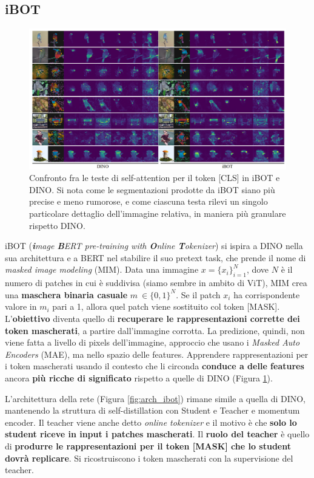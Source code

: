 \subsection{iBOT}
\begin{figure}[!t]
    \centering
    \includegraphics[width=\textwidth]{Immagini/ssl/ibot_vs_dino.png}
    \caption{Confronto fra le teste di self-attention per il token [CLS] in iBOT e DINO. Si nota come le segmentazioni prodotte da iBOT siano più precise e meno rumorose, e come ciascuna testa rilevi un singolo particolare dettaglio dell'immagine relativa, in maniera più granulare rispetto DINO.}
    \label{fig:ibotvsdino}
\end{figure}
iBOT (\textit{\textbf{i}mage \textbf{B}ERT pre-training with \textbf{O}nline \textbf{T}okenizer}) si ispira a DINO nella sua architettura e a BERT nel stabilire il suo pretext task, che prende il nome di \textit{masked image modeling} (MIM). Data una immagine \(x=\{x_i\}^N_{i=1}\), dove \(N\) è il numero di patches in cui è suddivisa (siamo sembre in ambito di ViT), MIM crea una \textbf{maschera binaria casuale} \(m \ \in \{0, 1\}^N\). Se il patch \(x_i\) ha corrispondente valore in \(m_i\) pari a 1, allora quel patch viene sostituito col token [MASK]. L'\textbf{obiettivo} diventa quello di \textbf{recuperare le rappresentazioni corrette dei token mascherati}, a partire dall'immagine corrotta. La predizione, quindi, non viene fatta a livello di pixels dell'immagine, approccio che usano i \textit{Masked Auto Encoders} (MAE), ma nello spazio delle features. Apprendere rappresentazioni per i token mascherati usando il contesto che li circonda \textbf{conduce a delle features} ancora \textbf{più ricche di significato} rispetto a quelle di DINO (Figura \ref{fig:ibotvsdino}).


L'architettura della rete (Figura \ref{fig:arch_ibot}) rimane simile a quella di DINO, mantenendo la struttura di self-distillation con Student e Teacher e momentum encoder. Il teacher viene anche detto \textit{online tokenizer} e il motivo è che \textbf{solo lo student riceve in input i patches mascherati}. Il \textbf{ruolo del teacher} è quello di \textbf{produrre le rappresentazioni per il token [MASK] che lo student dovrà replicare}. Si ricostruiscono i token mascherati con la supervisione del teacher.

